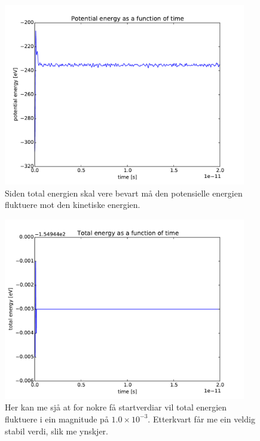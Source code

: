 \documentclass[12pt, a4paper]{article}
\theoremstyle{definition} \newtheorem*{definition}{Teorem}
\begin{document}
            \begin{figure}[H]
                \centering
                \includegraphics[width=400px]{potentialEnergy.pdf}
                \caption{Siden total energien skal vere bevart må den potensielle energien fluktuere mot den kinetiske energien.}
            \end{figure}
            \begin{figure}[H]
                \centering
                \includegraphics[width=400px]{totalEnergy.pdf}
                \caption{Her kan me sjå at for nokre få startverdiar vil total energien fluktuere i ein magnitude på $1.0\times10^{-3}$. Etterkvart får me ein veldig stabil
                         verdi, slik me ynskjer.}
            \end{figure}
\end{document}
